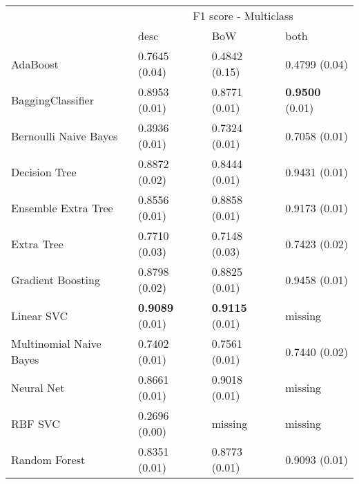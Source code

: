 \begin{tabular}{|l|l|l|l| }
\hline
 &  \multicolumn{3}{c|}{ F1 score - Multiclass} \\
\cline{2-4} & desc & BoW & both \\ \hline
AdaBoost                & 0.7645 (0.04) & 0.4842 (0.15) & 0.4799 (0.04)\\
BaggingClassifier       & 0.8953 (0.01) & 0.8771 (0.01) & {\bf 0.9500} (0.01)\\
Bernoulli Naive Bayes   & 0.3936 (0.01) & 0.7324 (0.01) & 0.7058 (0.01)\\
Decision Tree           & 0.8872 (0.02) & 0.8444 (0.01) & 0.9431 (0.01)\\
Ensemble Extra Tree     & 0.8556 (0.01) & 0.8858 (0.01) & 0.9173 (0.01)\\
Extra Tree              & 0.7710 (0.03) & 0.7148 (0.03) & 0.7423 (0.02)\\
Gradient Boosting       & 0.8798 (0.02) & 0.8825 (0.01) & 0.9458 (0.01)\\
Linear SVC              & {\bf 0.9089} (0.01) & {\bf 0.9115} (0.01) & missing \\
Multinomial Naive Bayes & 0.7402 (0.01) & 0.7561 (0.01) & 0.7440 (0.02)\\
Neural Net              & 0.8661 (0.01) & 0.9018 (0.01) & missing \\
RBF SVC                 & 0.2696 (0.00) & missing  & missing \\
Random Forest           & 0.8351 (0.01) & 0.8773 (0.01) & 0.9093 (0.01)\\
\hline
\end{tabular}